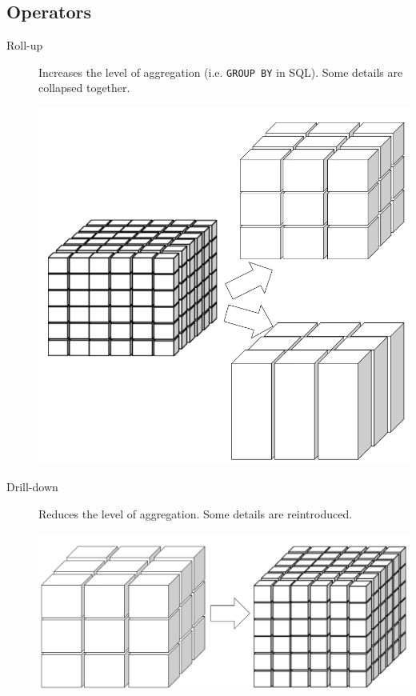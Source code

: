 \subsection{Operators}

\begin{description}
    \item[Roll-up] 
        \begin{minipage}{0.7\textwidth}
            Increases the level of aggregation (i.e. \texttt{GROUP BY} in SQL).
            Some details are collapsed together.
        \end{minipage}
        \hfill
        \begin{minipage}{0.15\textwidth}
            \centering
            \includegraphics[width=\linewidth]{img/olap_rollup.png}
        \end{minipage}

    \item[Drill-down] 
        \begin{minipage}{0.7\textwidth}
            Reduces the level of aggregation.
            Some details are reintroduced.
        \end{minipage}
        \hfill
        \begin{minipage}{0.15\textwidth}
            \centering
            \includegraphics[width=\linewidth]{img/olap_drilldown.png}
        \end{minipage}
    

\end{description}
